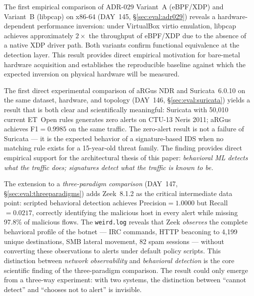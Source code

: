 \documentclass[11pt,a4paper]{article}
\begin{document}
    The first empirical comparison of ADR-029 Variant~A (eBPF/XDP) and Variant~B (libpcap)
    on x86-64 (DAY~145, \S\ref{sec:eval:adr029}) reveals a hardware-dependent performance
    inversion: under VirtualBox virtio emulation, libpcap achieves approximately $2\times$
    the throughput of eBPF/XDP due to the absence of a native XDP driver path. Both variants
    confirm functional equivalence at the detection layer. This result provides direct
    empirical motivation for bare-metal hardware acquisition and establishes the reproducible
    baseline against which the expected inversion on physical hardware will be measured.

    The first direct experimental comparison of aRGus NDR and Suricata~6.0.10 on the same
    dataset, hardware, and topology (DAY~146, \S\ref{sec:eval:suricata}) yields a result that
    is both clear and scientifically meaningful: Suricata with 50,010 current ET~Open rules
    generates zero alerts on CTU-13 Neris 2011; aRGus achieves F1$=0.9985$ on the same traffic.
    The zero-alert result is not a failure of Suricata --- it is the expected behavior of a
    signature-based IDS when no matching rule exists for a 15-year-old threat family. The
    finding provides direct empirical support for the architectural thesis of this paper:
    \emph{behavioral ML detects what the traffic does; signatures detect what the traffic is
    known to be.}

    The extension to a \emph{three-paradigm comparison} (DAY~147,
    \S\ref{sec:eval:threeparadigms}) adds Zeek~8.1.2 as the critical intermediate
    data point: scripted behavioral detection achieves Precision$=1.0000$ but
    Recall$=0.0217$, correctly identifying the malicious host in every alert while
    missing 97.8\% of malicious flows. The \texttt{weird.log} reveals that Zeek
    \emph{observes} the complete behavioral profile of the botnet --- IRC commands,
    HTTP beaconing to 4,199 unique destinations, SMB lateral movement, 82 spam
    sessions --- without converting these observations to alerts under default
    policy scripts. This distinction between \emph{network observability} and
    \emph{behavioral detection} is the core scientific finding of the three-paradigm
    comparison. The result could only emerge from a three-way experiment: with two
    systems, the distinction between ``cannot detect'' and ``chooses not to alert''
    is invisible.
\end{document}
